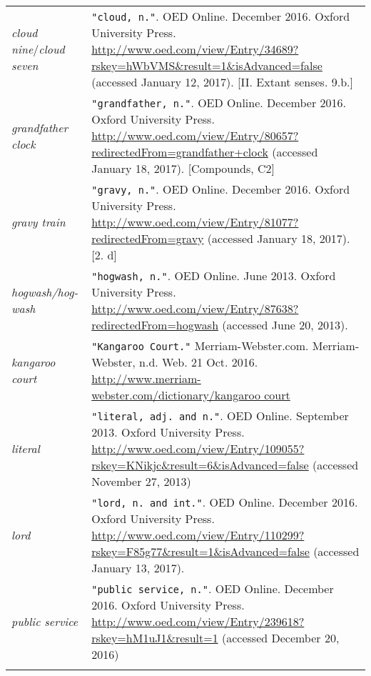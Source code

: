 \begin{tabular}{>{\raggedright\arraybackslash}p{2.1cm}>{\raggedright\arraybackslash}p{8.9cm}}\lsptoprule
{}&\\\midrule
\emph{cloud nine}/\emph{cloud seven}&\texttt{"cloud, n."}. OED Online. December 2016. Oxford University Press. \url{http://www.oed.com/view/Entry/34689?rskey=hWbVMS&result=1&isAdvanced=false} (accessed January 12, 2017).
[II. Extant senses. 9.b.]\\
\emph{grandfather clock}&\texttt{"grandfather, n."}. OED Online. December 2016. Oxford University Press. \url{http://www.oed.com/view/Entry/80657?redirectedFrom=grandfather+clock} (accessed January 18, 2017). [Compounds, C2]\\
\emph{gravy train}&\texttt{"gravy, n."}. OED Online. December 2016. Oxford University Press. \url{http://www.oed.com/view/Entry/81077?redirectedFrom=gravy} (accessed January 18, 2017). [2. d]\\
\emph{hogwash/hog-wash}&\texttt{"hogwash, n."}. OED Online. June 2013. Oxford University
Press. \url{http://www.oed.com/view/Entry/87638?redirectedFrom=hogwash} (accessed
June 20, 2013).\\ 
\emph{kangaroo court}&\texttt{"Kangaroo Court."} Merriam-Webster.com. Merriam-Webster, n.d. Web. 21 Oct. 2016. \url{http://www.merriam-webster.com/dictionary/kangaroo court}\\
\emph{literal}&\texttt{"literal, adj. and n."}. OED Online. September 2013. Oxford University Press. \url{http://www.oed.com/view/Entry/109055?rskey=KNikjc&result=6&isAdvanced=false} (accessed November 27, 2013)\\
\emph{lord}&\texttt{"lord, n. and int."}. OED Online. December 2016. Oxford University Press. \url{http://www.oed.com/view/Entry/110299?rskey=F85g77&result=1&isAdvanced=false} (accessed January 13, 2017).\\
\emph{public service}&\texttt{"public service, n."}. OED Online. December 2016. Oxford University Press. \url{http://www.oed.com/view/Entry/239618?rskey=hM1uJ1&result=1} (accessed December 20, 2016)
\\\lspbottomrule
\end{tabular}
